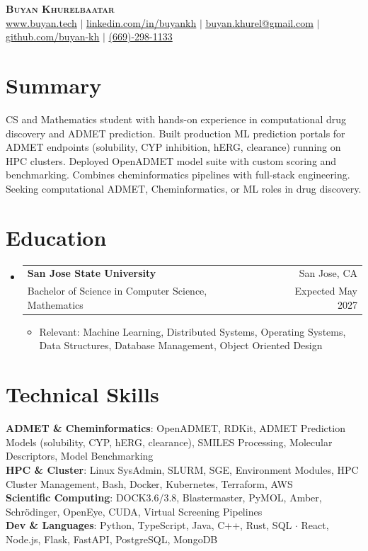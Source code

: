 \documentclass[letterpaper,11pt]{article}
\makeatletter
\newcommand{\resumeItem}[1]{
  \item\small{
    {#1 \vspace{-2pt}}
  }
}
\newcommand{\resumeSubheading}[4]{
  \vspace{-2pt}\item
    \begin{tabular*}{0.97\textwidth}[t]{l@{\extracolsep{\fill}}r}
      \textbf{#1} & #2 \\
      {\small#3} & {\small#4} \\
    \end{tabular*}\vspace{-7pt}
}
\newcommand{\resumeSubHeadingListStart}{\begin{itemize}[leftmargin=0.15in, label={}]}
\newcommand{\resumeSubHeadingListEnd}{\end{itemize}}
\newcommand{\resumeItemListStart}{\begin{itemize}}
\newcommand{\resumeItemListEnd}{\end{itemize}\vspace{-5pt}}
\makeatother
\begin{document}
\begin{center}
    \textbf{\Huge \scshape Buyan Khurelbaatar} \\ \vspace{1pt}
    \href{https://buyan.tech}{\underline{www.buyan.tech}} $|$
    \href{https://linkedin.com/in/buyankh}{\underline{linkedin.com/in/buyankh}} $|$
    \href{mailto:buyan.khurel@gmail.com}{\underline{buyan.khurel@gmail.com}} $|$ 
    \href{https://github.com/buyan-kh}{\underline{github.com/buyan-kh}} $|$
    {\underline{(669)-298-1133}}
\end{center}

\section{Summary}
CS and Mathematics student with hands-on experience in computational drug discovery and ADMET prediction. Built production ML prediction portals for ADMET endpoints (solubility, CYP inhibition, hERG, clearance) running on HPC clusters. Deployed OpenADMET model suite with custom scoring and benchmarking. Combines cheminformatics pipelines with full-stack engineering. Seeking computational ADMET, Cheminformatics, or ML roles in drug discovery.

\section{Education}
  \resumeSubHeadingListStart
    \resumeSubheading
      {San Jose State University}{San Jose, CA}
      {Bachelor of Science in Computer Science, Mathematics}{Expected May 2027}
      \resumeItemListStart
        \resumeItem{Relevant: Machine Learning, Distributed Systems, Operating Systems, Data Structures, Database Management, Object Oriented Design}
    \resumeItemListEnd
  \resumeSubHeadingListEnd


\section{Technical Skills}
 \begin{itemize}[leftmargin=0.15in, label={}]
    \small{\item{
     \textbf{ADMET \& Cheminformatics}{: OpenADMET, RDKit, ADMET Prediction Models (solubility, CYP, hERG, clearance), SMILES Processing, Molecular Descriptors, Model Benchmarking} \\
     \textbf{HPC \& Cluster}{: Linux SysAdmin, SLURM, SGE, Environment Modules, HPC Cluster Management, Bash, Docker, Kubernetes, Terraform, AWS} \\
     \textbf{Scientific Computing}{: DOCK3.6/3.8, Blastermaster, PyMOL, Amber, Schr\"odinger, OpenEye, CUDA, Virtual Screening Pipelines} \\
     \textbf{Dev \& Languages}{: Python, TypeScript, Java, C++, Rust, SQL $\cdot$ React, Node.js, Flask, FastAPI, PostgreSQL, MongoDB}
    }}
 \end{itemize}
 
\end{document}
